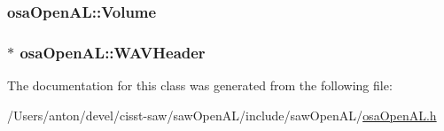 \subsubsection[{Volume}]{ osa\+Open\+A\+L\+::\+Volume\hspace{0.3cm}{\ttfamily [protected]}}\label{classosa_open_a_l_a37e986d3fd52a05679b555fff97910c7}
\hypertarget{classosa_open_a_l_af8c26f914553075852638d829c06a74d}{}
\subsubsection[{W\+A\+V\+Header}]{$\ast$ osa\+Open\+A\+L\+::\+W\+A\+V\+Header\hspace{0.3cm}{\ttfamily [protected]}}\label{classosa_open_a_l_af8c26f914553075852638d829c06a74d}


The documentation for this class was generated from the following file\+:\begin{DoxyCompactItemize}
\item 
/\+Users/anton/devel/cisst-\/saw/saw\+Open\+A\+L/include/saw\+Open\+A\+L/\hyperlink{osa_open_a_l_8h}{osa\+Open\+A\+L.\+h}\end{DoxyCompactItemize}
